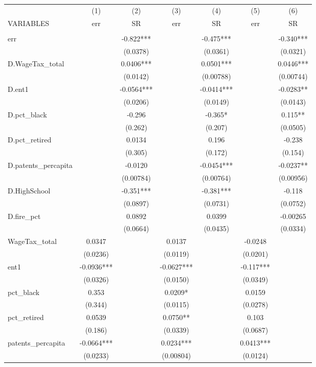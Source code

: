\begin{tabular}{lcccccc} \hline
 & (1) & (2) & (3) & (4) & (5) & (6) \\
VARIABLES & err & SR & err & SR & err & SR \\ \hline
 &  &  &  &  &  &  \\
err &  & -0.822*** &  & -0.475*** &  & -0.340*** \\
 &  & (0.0378) &  & (0.0361) &  & (0.0321) \\
D.WageTax\_total &  & 0.0406*** &  & 0.0501*** &  & 0.0446*** \\
 &  & (0.0142) &  & (0.00788) &  & (0.00744) \\
D.ent1 &  & -0.0564*** &  & -0.0414*** &  & -0.0283** \\
 &  & (0.0206) &  & (0.0149) &  & (0.0143) \\
D.pct\_black &  & -0.296 &  & -0.365* &  & 0.115** \\
 &  & (0.262) &  & (0.207) &  & (0.0505) \\
D.pct\_retired &  & 0.0134 &  & 0.196 &  & -0.238 \\
 &  & (0.305) &  & (0.172) &  & (0.154) \\
D.patents\_percapita &  & -0.0120 &  & -0.0454*** &  & -0.0237** \\
 &  & (0.00784) &  & (0.00764) &  & (0.00956) \\
D.HighSchool &  & -0.351*** &  & -0.381*** &  & -0.118 \\
 &  & (0.0897) &  & (0.0731) &  & (0.0752) \\
D.fire\_pct &  & 0.0892 &  & 0.0399 &  & -0.00265 \\
 &  & (0.0664) &  & (0.0435) &  & (0.0334) \\
WageTax\_total & 0.0347 &  & 0.0137 &  & -0.0248 &  \\
 & (0.0236) &  & (0.0119) &  & (0.0201) &  \\
ent1 & -0.0936*** &  & -0.0627*** &  & -0.117*** &  \\
 & (0.0326) &  & (0.0150) &  & (0.0349) &  \\
pct\_black & 0.353 &  & 0.0209* &  & 0.0159 &  \\
 & (0.344) &  & (0.0115) &  & (0.0278) &  \\
pct\_retired & 0.0539 &  & 0.0750** &  & 0.103 &  \\
 & (0.186) &  & (0.0339) &  & (0.0687) &  \\
patents\_percapita & -0.0664*** &  & 0.0234*** &  & 0.0413*** &  \\
 & (0.0233) &  & (0.00804) &  & (0.0124) &  \\

\end{tabular}
